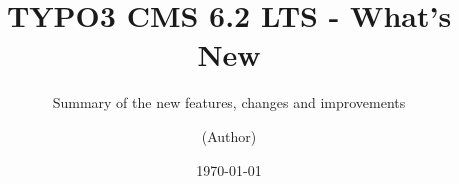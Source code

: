 %
%
%
%
%

%
%

\documentclass[t]{beamer}

\beamertemplatenavigationsymbolsempty

{
	\usetheme{typo3slides}
}

\title{TYPO3 CMS 6.2 LTS - What's New}
\subtitle{Summary of the new features, changes and improvements}
\author{(Author)}
\date{\today}



\sharefont


\begingroup
	[default]
	\begin{frame}
		\titlepage
	\end{frame}
\endgroup



